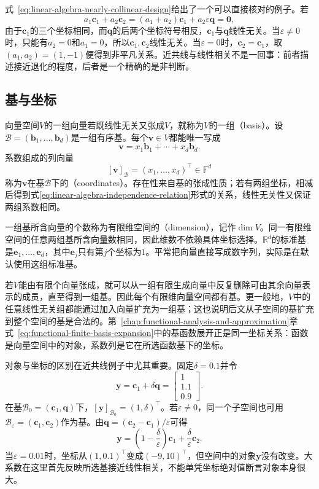 式~\eqref{eq:linear-algebra-nearly-collinear-design}给出了一个可以直接核对的例子。若
\[
  a_1\bm{c}_1+a_2\bm{c}_2
  =
  (a_1+a_2)\bm{c}_1+a_2\varepsilon\bm{q}
  =
  \bm{0},
\]
由于$\bm{c}_1$的三个坐标相同，而$\bm{q}$的后两个坐标符号相反，$\bm{c}_1$与$\bm{q}$线性无关。当$\varepsilon\neq0$时，只能有$a_2=0$和$a_1=0$，所以$\bm{c}_1,\bm{c}_2$线性无关。当$\varepsilon=0$时，$\bm{c}_2=\bm{c}_1$，取$(a_1,a_2)=(1,-1)$便得到非平凡关系。近共线与线性相关不是一回事：前者描述接近退化的程度，后者是一个精确的是非判断。

\subsection{基与坐标}

向量空间$V$的一组向量若既线性无关又张成$V$，就称为$V$的一组（basis）。设$\mathcal{B}=(\bm{b}_1,\ldots,\bm{b}_d)$是一组有序基。每个$\bm{v}\in V$都能唯一写成
\[
  \bm{v}
  =
  x_1\bm{b}_1+\cdots+x_d\bm{b}_d.
\]
系数组成的列向量
\[
  [\bm{v}]_{\mathcal{B}}
  =
  (x_1,\ldots,x_d)^{\top}\in\mathbb{F}^d
\]
称为$\bm{v}$在基$\mathcal{B}$下的（coordinates）。存在性来自基的张成性质；若有两组坐标，相减后得到式\eqref{eq:linear-algebra-independence-relation}形式的关系，线性无关性又保证两组系数相同。

一组基所含向量的个数称为有限维空间的（dimension），记作$\dim V$。同一有限维空间的任意两组基所含向量数相同，因此维数不依赖具体坐标选择。$\mathbb{R}^d$的标准基是$\bm{e}_1,\ldots,\bm{e}_d$，其中$\bm{e}_j$只有第$j$个坐标为$1$。平常把向量直接写成数字列，实际是在默认使用这组标准基。

若$V$能由有限个向量张成，就可以从一组有限生成向量中反复删除可由其余向量表示的成员，直至得到一组基。因此每个有限维向量空间都有基。更一般地，$V$中的任意线性无关组都能通过加入向量扩充为一组基；这也说明后文从子空间的基扩充到整个空间的基是合法的。第~\ref{chap:functional-analysis-and-approximation}章式~\eqref{eq:functional-finite-basis-expansion}中的基函数展开正是同一坐标关系：函数是向量空间中的对象，系数列是它在所选函数基下的坐标。

对象与坐标的区别在近共线例子中尤其重要。固定$\delta=0.1$并令
\begin{equation}
  \bm{y} = \bm{c}_1+\delta\bm{q} = \begin{bmatrix} 1\\1.1\\0.9 \end{bmatrix}. \label{eq:linear-algebra-nearly-collinear-target}
\end{equation}
在基$\mathcal{B}_0=(\bm{c}_1,\bm{q})$下，$[\bm{y}]_{\mathcal{B}_0}=(1,\delta)^{\top}$。若$\varepsilon\neq0$，同一个子空间也可用$\mathcal{B}_{\varepsilon}=(\bm{c}_1,\bm{c}_2)$作为基。由$\bm{q}=(\bm{c}_2-\bm{c}_1)/\varepsilon$可得
\begin{equation}
  \bm{y} = \left(1-\frac{\delta}{\varepsilon}\right)\bm{c}_1 + \frac{\delta}{\varepsilon}\bm{c}_2. \label{eq:linear-algebra-coordinate-instability}
\end{equation}
当$\varepsilon=0.01$时，坐标从$(1,0.1)^{\top}$变成$(-9,10)^{\top}$，但空间中的对象$\bm{y}$没有改变。大系数在这里首先反映所选基接近线性相关，不能单凭坐标绝对值断言对象本身很大。

